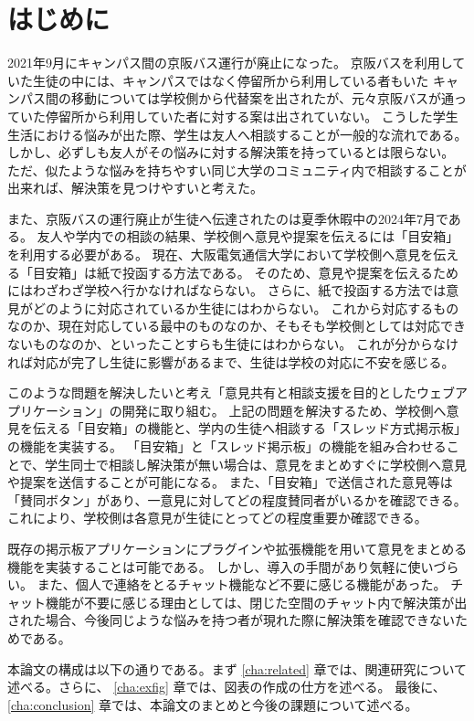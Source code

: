 \documentclass[main]{subfiles}
\begin{document}
\chapter{はじめに}
\label{cha:intro}

2021年9月にキャンパス間の京阪バス運行が廃止になった。
京阪バスを利用していた生徒の中には、キャンパスではなく停留所から利用している者もいた %
キャンパス間の移動については学校側から代替案を出されたが、元々京阪バスが通っていた停留所から利用していた者に対する案は出されていない。
こうした学生生活における悩みが出た際、学生は友人へ相談することが一般的な流れである。
しかし、必ずしも友人がその悩みに対する解決策を持っているとは限らない。
ただ、似たような悩みを持ちやすい同じ大学のコミュニティ内で相談することが出来れば、解決策を見つけやすいと考えた。

また、京阪バスの運行廃止が生徒へ伝達されたのは夏季休暇中の2024年7月である。
友人や学内での相談の結果、学校側へ意見や提案を伝えるには「目安箱」を利用する必要がある。
現在、大阪電気通信大学において学校側へ意見を伝える「目安箱」は紙で投函する方法である。
そのため、意見や提案を伝えるためにはわざわざ学校へ行かなければならない。
さらに、紙で投函する方法では意見がどのように対応されているか生徒にはわからない。
これから対応するものなのか、現在対応している最中のものなのか、そもそも学校側としては対応できないものなのか、といったことすらも生徒にはわからない。
これが分からなければ対応が完了し生徒に影響があるまで、生徒は学校の対応に不安を感じる。

このような問題を解決したいと考え「意見共有と相談支援を目的としたウェブアプリケーション」の開発に取り組む。
上記の問題を解決するため、学校側へ意見を伝える「目安箱」の機能と、学内の生徒へ相談する「スレッド方式掲示板」の機能を実装する。
「目安箱」と「スレッド掲示板」の機能を組み合わせることで、学生同士で相談し解決策が無い場合は、意見をまとめすぐに学校側へ意見や提案を送信することが可能になる。
また、「目安箱」で送信された意見等は「賛同ボタン」があり、一意見に対してどの程度賛同者がいるかを確認できる。
これにより、学校側は各意見が生徒にとってどの程度重要か確認できる。

既存の掲示板アプリケーションにプラグインや拡張機能を用いて意見をまとめる機能を実装することは可能である。
しかし、導入の手間があり気軽に使いづらい。 %
また、個人で連絡をとるチャット機能など不要に感じる機能があった。
チャット機能が不要に感じる理由としては、閉じた空間のチャット内で解決策が出された場合、今後同じような悩みを持つ者が現れた際に解決策を確認できないためである。

本論文の構成は以下の通りである。まず \ref{cha:related} 章では、関連研究について述べる。さらに、
\ref{cha:exfig} 章では、図表の作成の仕方を述べる。
最後に、\ref{cha:conclusion} 章では、本論文のまとめと今後の課題について述べる。
\end{document}
